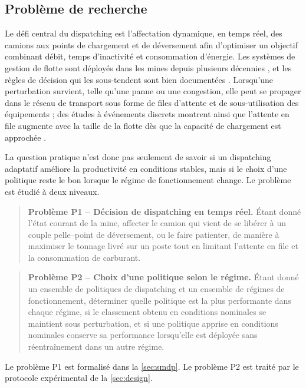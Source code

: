 \documentclass[11pt,a4paper]{article}
\newif\ifrevmarks
\newcommand{\revtag}[1]{\ifrevmarks\textsuperscript{\textcolor{red!70!black}{\scriptsize[#1]}}\fi}
\newenvironment{revbloc}[1]{\par\ifrevmarks\color{revcolor}\noindent\revtag{#1}\ \fi}{\par}
\begin{document}
\subsection{Problème de recherche}
\label{sec:problem-statement}

\begin{revbloc}{M24}
Le défi central du dispatching est l'affectation dynamique, en temps réel, des camions aux points de chargement et de déversement afin d'optimiser un objectif combinant débit, temps d'inactivité et consommation d'énergie. Les systèmes de gestion de flotte sont déployés dans les mines depuis plusieurs décennies \cite{Afrapoli2017, AlexandraNewman2010}, et les règles de décision qui les sous-tendent sont bien documentées \cite{MohanMunirathinam1994, Alarie2002}. Lorsqu'une perturbation survient, telle qu'une panne ou une congestion, elle peut se propager dans le réseau de transport sous forme de files d'attente et de sous-utilisation des équipements ; des études à événements discrets montrent ainsi que l'attente en file augmente avec la taille de la flotte dès que la capacité de chargement est approchée \cite{Zeng2022, NecmettinCetin2004}.

La question pratique n'est donc pas seulement de savoir si un dispatching adaptatif améliore la productivité en conditions stables, mais si le choix d'une politique reste le bon lorsque le régime de fonctionnement change. Le problème est étudié à deux niveaux.

\begin{quote}
\textbf{Problème P1 -- Décision de dispatching en temps réel.}
Étant donné l'état courant de la mine, affecter le camion qui vient de se libérer à un couple pelle--point de déversement, ou le faire patienter, de manière à maximiser le tonnage livré sur un poste tout en limitant l'attente en file et la consommation de carburant.
\end{quote}

\begin{quote}
\textbf{Problème P2 -- Choix d'une politique selon le régime.}
Étant donné un ensemble de politiques de dispatching et un ensemble de régimes de fonctionnement, déterminer quelle politique est la plus performante dans chaque régime, si le classement obtenu en conditions nominales se maintient sous perturbation, et si une politique apprise en conditions nominales conserve sa performance lorsqu'elle est déployée sans réentraînement dans un autre régime.
\end{quote}

Le problème P1 est formalisé dans la \cref{sec:smdp}. Le problème P2 est traité par le protocole expérimental de la \cref{sec:design}.
\end{revbloc}
\end{document}
